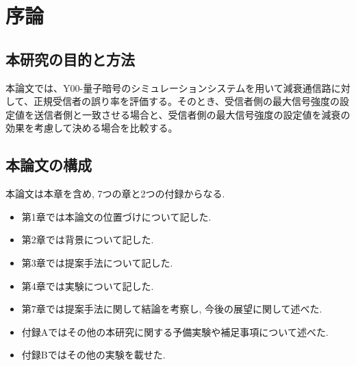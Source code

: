 \chapter{序論}

\section{本研究の目的と方法}
本論文では、Y00-量子暗号のシミュレーションシステムを用いて減衰通信路に対して、正規受信者の誤り率を評価する。そのとき、受信者側の最大信号強度の設定値を送信者側と一致させる場合と、受信者側の最大信号強度の設定値を減衰の効果を考慮して決める場合を比較する。


\section{本論文の構成}
本論文は本章を含め, 7つの章と2つの付録からなる.
\begin{itemize}
	\item 第1章では本論文の位置づけについて記した.
	\item 第2章では背景について記した.
	\item 第3章では提案手法について記した.
	\item 第4章では実験について記した.
	\item 第7章では提案手法に関して結論を考察し, 今後の展望に関して述べた.
	\item 付録Aではその他の本研究に関する予備実験や補足事項について述べた.
	\item 付録Bではその他の実験を載せた.
\end{itemize}